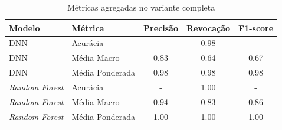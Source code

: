 \begin{table}[H]
  \centering
  \small
  \begin{tabular}{llccc}
    \hline
    \textbf{Modelo} & \textbf{Métrica} & \textbf{Precisão} & \textbf{Revocação} & \textbf{F1-score} \\
    \hline
    DNN             & Acurácia         & -                 & 0.98               & -                 \\
    DNN             & Média Macro      & 0.83              & 0.64               & 0.67              \\
    DNN             & Média Ponderada  & 0.98              & 0.98               & 0.98              \\
    \hline
    \textit{Random Forest}   & Acurácia         & -                 & 1.00               & -                 \\
    \textit{Random Forest}   & Média Macro      & 0.94              & 0.83               & 0.86              \\
    \textit{Random Forest}   & Média Ponderada  & 1.00              & 1.00               & 1.00              \\
    \hline
  \end{tabular}
  \caption{Métricas agregadas no variante completa}
  \label{tab:total_completo_metricas}
\end{table}